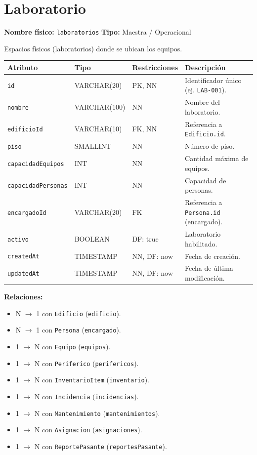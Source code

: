 \documentclass[12pt,a4paper]{article}
\newenvironment{tabladesc}[3]{%
  \section{#1}
  \textbf{Nombre físico:} \texttt{#2} \hfill \textbf{Tipo:} #3\par
  \medskip
}{%
  \bigskip
}
\begin{document}
\begin{tabladesc}{Laboratorio}{laboratorios}{Maestra / Operacional}

Espacios físicos (laboratorios) donde se ubican los equipos.

\bigskip
\begin{longtable}{L{3.5cm} L{2.5cm} L{2cm} L{7.5cm}}
\toprule
\textbf{Atributo} & \textbf{Tipo} & \textbf{Restricciones} & \textbf{Descripción} \\
\midrule
\endhead
\bottomrule
\endfoot
\texttt{id}              & VARCHAR(20)  & PK, NN & Identificador único (ej. \texttt{LAB-001}). \\
\texttt{nombre}          & VARCHAR(100) & NN     & Nombre del laboratorio. \\
\texttt{edificioId}      & VARCHAR(10)  & FK, NN & Referencia a \texttt{Edificio.id}. \\
\texttt{piso}            & SMALLINT     & NN     & Número de piso. \\
\texttt{capacidadEquipos}& INT          & NN     & Cantidad máxima de equipos. \\
\texttt{capacidadPersonas}& INT         & NN     & Capacidad de personas. \\
\texttt{encargadoId}     & VARCHAR(20)  & FK     & Referencia a \texttt{Persona.id} (encargado). \\
\texttt{activo}          & BOOLEAN      & DF: true & Laboratorio habilitado. \\
\texttt{createdAt}       & TIMESTAMP    & NN, DF: now & Fecha de creación. \\
\texttt{updatedAt}       & TIMESTAMP    & NN, DF: now & Fecha de última modificación. \\
\bottomrule
\end{longtable}

\textbf{Relaciones:}
\begin{itemize}[nosep]
  \item N $\rightarrow$ 1 con \texttt{Edificio} (\texttt{edificio}).
  \item N $\rightarrow$ 1 con \texttt{Persona} (\texttt{encargado}).
  \item 1 $\rightarrow$ N con \texttt{Equipo} (\texttt{equipos}).
  \item 1 $\rightarrow$ N con \texttt{Periferico} (\texttt{perifericos}).
  \item 1 $\rightarrow$ N con \texttt{InventarioItem} (\texttt{inventario}).
  \item 1 $\rightarrow$ N con \texttt{Incidencia} (\texttt{incidencias}).
  \item 1 $\rightarrow$ N con \texttt{Mantenimiento} (\texttt{mantenimientos}).
  \item 1 $\rightarrow$ N con \texttt{Asignacion} (\texttt{asignaciones}).
  \item 1 $\rightarrow$ N con \texttt{ReportePasante} (\texttt{reportesPasante}).
\end{itemize}
\end{tabladesc}
\end{document}
